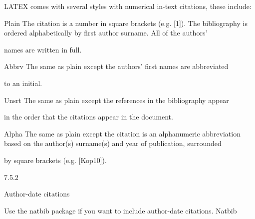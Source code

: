 \documentclass[a4paper,portrait,12pt]{article}
\begin{document}
\begin{flushleft}
LATEX comes with several styles with numerical in-text citations, these include:
\end{flushleft}


\begin{flushleft}
Plain The citation is a number in square brackets (e.g. [1]). The bibliography is ordered alphabetically by first author surname. All of the authors'
\end{flushleft}


\begin{flushleft}
names are written in full.
\end{flushleft}


\begin{flushleft}
Abbrv The same as plain except the authors' first names are abbreviated
\end{flushleft}


\begin{flushleft}
to an initial.
\end{flushleft}


\begin{flushleft}
Unsrt The same as plain except the references in the bibliography appear
\end{flushleft}


\begin{flushleft}
in the order that the citations appear in the document.
\end{flushleft}


\begin{flushleft}
Alpha The same as plain except the citation is an alphanumeric abbreviation based on the author(s) surname(s) and year of publication, surrounded
\end{flushleft}


\begin{flushleft}
by square brackets (e.g. [Kop10]).
\end{flushleft}





7.5.2





\begin{flushleft}
Author-date citations
\end{flushleft}





\begin{flushleft}
Use the natbib package if you want to include author-date citations. Natbib
\end{flushleft}
\end{document}
